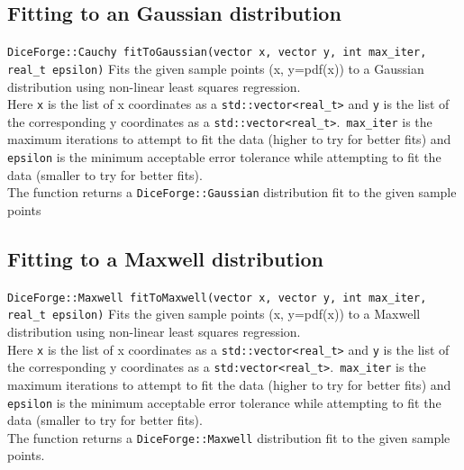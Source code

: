 \documentclass[titlepage, 11pt]{article}
\newcommand{\code}[1]
{\colorbox{light-gray}{\texttt{#1}}}
\begin{document}
\subsection{Fitting to an Gaussian distribution}
\code{DiceForge::Cauchy fitToGaussian(vector x, vector y, int max\_iter,}
\newline
\code{real\_t epsilon)}
\newline
\newline
Fits the given sample points (x, y=pdf(x)) to a Gaussian distribution using non-linear least squares regression.
\newline\\
Here \code{x} is the list of x coordinates as a \code{std::vector<real\_t>} and \code{y} is the list of the corresponding y coordinates as a \code{std::vector<real\_t>}.\
\code{max\_iter} is the maximum iterations to attempt to fit the data (higher to try for better fits) and \code{epsilon} is the minimum acceptable error tolerance while attempting to fit the data (smaller to try for better fits).\\
\newline
The function returns a \code{DiceForge::Gaussian} distribution fit to the given sample points
\subsection{Fitting to a Maxwell distribution}
\code{DiceForge::Maxwell fitToMaxwell(vector x, vector y, int max\_iter,}
\newline
\code{real\_t epsilon)}
\newline 
\newline
Fits the given sample points (x, y=pdf(x)) to a Maxwell distribution using non-linear least squares regression.
\newline\\
Here \code{x} is the list of x coordinates as a \code{std::vector<real\_t>} and \code{y} is the list of the corresponding y coordinates as a \code{std:vector<real\_t>}.\
\code{max\_iter} is the maximum iterations to attempt to fit the data (higher to try for better fits) and \code{epsilon} is the minimum acceptable error tolerance while attempting to fit the data (smaller to try for better fits).\\
\newline
The function returns a \code{DiceForge::Maxwell} distribution fit to the given sample points.
\end{document}
